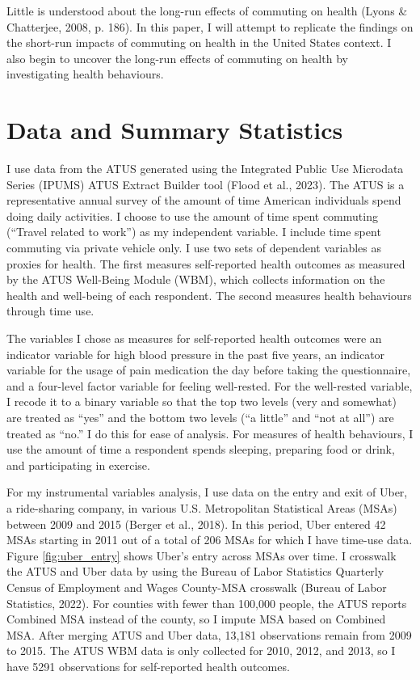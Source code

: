 \documentclass{eco481_paper}
\begin{document}
Little is understood about the long-run effects of commuting on health (Lyons \& Chatterjee, 2008, p. 186). In this paper, I will attempt to replicate the findings on the short-run impacts of commuting on health in the United States context. I also begin to uncover the long-run effects of commuting on health by investigating health behaviours.

\section*{Data and Summary Statistics}

I use data from the ATUS generated using the Integrated Public Use Microdata Series (IPUMS) ATUS Extract Builder tool (Flood et al., 2023). The ATUS is a representative annual survey of the amount of time American individuals spend doing daily activities. I choose to use the amount of time spent commuting (“Travel related to work”) as my independent variable. I include time spent commuting via private vehicle only. I use two sets of dependent variables as proxies for health. The first measures self-reported health outcomes as measured by the ATUS Well-Being Module (WBM), which collects information on the health and well-being of each respondent. The second measures health behaviours through time use. 

The variables I chose as measures for self-reported health outcomes were an indicator variable for high blood pressure in the past five years, an indicator variable for the usage of pain medication the day before taking the questionnaire, and a four-level factor variable for feeling well-rested. For the well-rested variable, I recode it to a binary variable so that the top two levels (very and somewhat) are treated as “yes” and the bottom two levels (“a little” and “not at all”) are treated as “no.” I do this for ease of analysis. For measures of health behaviours, I use the amount of time a respondent spends sleeping, preparing food or drink, and participating in exercise. 

For my instrumental variables analysis, I use data on the entry and exit of Uber, a ride-sharing company, in various U.S. Metropolitan Statistical Areas (MSAs) between 2009 and 2015 (Berger et al., 2018). In this period, Uber entered 42 MSAs starting in 2011 out of a total of 206 MSAs for which I have time-use data. Figure \ref*{fig:uber_entry} shows Uber’s entry across MSAs over time. I crosswalk the ATUS and Uber data by using the Bureau of Labor Statistics Quarterly Census of Employment and Wages County-MSA crosswalk (Bureau of Labor Statistics, 2022). For counties with fewer than 100,000 people, the ATUS reports Combined MSA instead of the county, so I impute MSA based on Combined MSA. After merging ATUS and Uber data, 13,181 observations remain from 2009 to 2015. The ATUS WBM data is only collected for 2010, 2012, and 2013, so I have 5291 observations for self-reported health outcomes.
\end{document}
